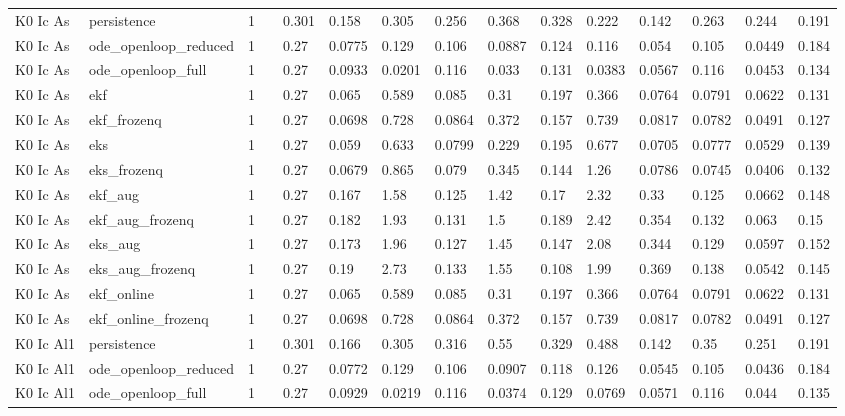 \begin{table}[t]
\begin{tabular}{lllllllllllllll}
K0 Ic As & persistence & 1 &  & 0.301 & 0.158 & 0.305 & 0.256 & 0.368 & 0.328 & 0.222 & 0.142 & 0.263 & 0.244 & 0.191 \\
K0 Ic As & ode\_openloop\_reduced & 1 &  & 0.27 & 0.0775 & 0.129 & 0.106 & 0.0887 & 0.124 & 0.116 & 0.054 & 0.105 & 0.0449 & 0.184 \\
K0 Ic As & ode\_openloop\_full & 1 &  & 0.27 & 0.0933 & 0.0201 & 0.116 & 0.033 & 0.131 & 0.0383 & 0.0567 & 0.116 & 0.0453 & 0.134 \\
K0 Ic As & ekf & 1 &  & 0.27 & 0.065 & 0.589 & 0.085 & 0.31 & 0.197 & 0.366 & 0.0764 & 0.0791 & 0.0622 & 0.131 \\
K0 Ic As & ekf\_frozenq & 1 &  & 0.27 & 0.0698 & 0.728 & 0.0864 & 0.372 & 0.157 & 0.739 & 0.0817 & 0.0782 & 0.0491 & 0.127 \\
K0 Ic As & eks & 1 &  & 0.27 & 0.059 & 0.633 & 0.0799 & 0.229 & 0.195 & 0.677 & 0.0705 & 0.0777 & 0.0529 & 0.139 \\
K0 Ic As & eks\_frozenq & 1 &  & 0.27 & 0.0679 & 0.865 & 0.079 & 0.345 & 0.144 & 1.26 & 0.0786 & 0.0745 & 0.0406 & 0.132 \\
K0 Ic As & ekf\_aug & 1 &  & 0.27 & 0.167 & 1.58 & 0.125 & 1.42 & 0.17 & 2.32 & 0.33 & 0.125 & 0.0662 & 0.148 \\
K0 Ic As & ekf\_aug\_frozenq & 1 &  & 0.27 & 0.182 & 1.93 & 0.131 & 1.5 & 0.189 & 2.42 & 0.354 & 0.132 & 0.063 & 0.15 \\
K0 Ic As & eks\_aug & 1 &  & 0.27 & 0.173 & 1.96 & 0.127 & 1.45 & 0.147 & 2.08 & 0.344 & 0.129 & 0.0597 & 0.152 \\
K0 Ic As & eks\_aug\_frozenq & 1 &  & 0.27 & 0.19 & 2.73 & 0.133 & 1.55 & 0.108 & 1.99 & 0.369 & 0.138 & 0.0542 & 0.145 \\
K0 Ic As & ekf\_online & 1 &  & 0.27 & 0.065 & 0.589 & 0.085 & 0.31 & 0.197 & 0.366 & 0.0764 & 0.0791 & 0.0622 & 0.131 \\
K0 Ic As & ekf\_online\_frozenq & 1 &  & 0.27 & 0.0698 & 0.728 & 0.0864 & 0.372 & 0.157 & 0.739 & 0.0817 & 0.0782 & 0.0491 & 0.127 \\
K0 Ic Al1 & persistence & 1 &  & 0.301 & 0.166 & 0.305 & 0.316 & 0.55 & 0.329 & 0.488 & 0.142 & 0.35 & 0.251 & 0.191 \\
K0 Ic Al1 & ode\_openloop\_reduced & 1 &  & 0.27 & 0.0772 & 0.129 & 0.106 & 0.0907 & 0.118 & 0.126 & 0.0545 & 0.105 & 0.0436 & 0.184 \\
K0 Ic Al1 & ode\_openloop\_full & 1 &  & 0.27 & 0.0929 & 0.0219 & 0.116 & 0.0374 & 0.129 & 0.0769 & 0.0571 & 0.116 & 0.044 & 0.135 \\

\end{tabular}
\end{table}
